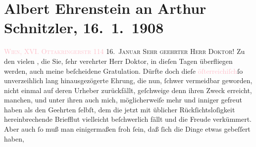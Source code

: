 

               \section[Albert Ehrenstein an Arthur Schnitzler, 16. 1. 1908]{ Albert Ehrenstein an Arthur Schnitzler, 16. 1. 1908}\nopagebreak{}\rehead{ }\normalsize\beginnumbering{} \toendnotes[C]{\smallbreak\pagebreak[2]} 
\toendnotes[C]{\smallbreak}\pstart
           \raggedleft{}{\pb}\textsc{\textcolor{pink}{Wien, XVI. Ottakringerstr 114}{}\ledrightnote{\textcolor{pink}{Ottakringerstraße}}}\pend
           \pstart
           \textsc{16. Januar \label{T_L01751_1v}\label{T_L01751_1h}}\pend
           \pstart\center{}\textsc{Sehr geehrter Herr Doktor!}\pend\pstart
           Zu den vielen \label{K_L01751_1v}\label{K_L01751_1h}, die Sie, ſehr verehrter Herr Doktor, in dieſen
               Tagen überfliegen werden, auch meine beſcheidene Gratulation.\pend
           \pstart
           Dürfte doch dieſe \textcolor{pink}{öſterreichiſch}{}\ledrightnote{\textcolor{pink}{Österreich}}{ }ſo unverzeihlich lang hinausgezögerte Ehrung, die
               nun, ſchwer vermeidbar geworden, nicht einmal auf deren Urheber zurückfällt,
               geſchweige denn ihren Zweck erreicht, manchen, und unter ihren auch mich,
               möglicherweiſe mehr und inniger gefreut haben als den Geehrten ſelbſt, dem die jetzt
               mit üblicher Rückſichtsloſigkeit hereinbrechende Briefflut vielleicht beſchwerlich
               fällt {\pb}und die Freude verkümmert. Aber
               auch ſo muß man einigermaßen froh ſein, daß ſich die Dinge etwas gebeſſert haben,
